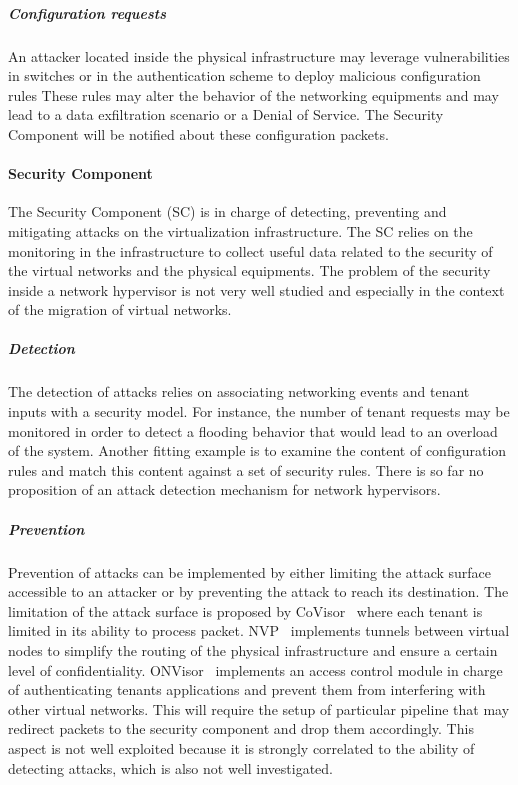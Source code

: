 \subparagraph{Configuration requests} An attacker located inside the physical infrastructure may leverage vulnerabilities in switches or in the authentication scheme to deploy malicious configuration rules These rules may alter the behavior of the networking equipments and may lead to a data exfiltration scenario or a Denial of Service.
The Security Component will be notified about these configuration packets.

\paragraph{Security Component}
The Security Component (SC) is in charge of detecting, preventing and mitigating attacks on the virtualization infrastructure. The SC relies on the monitoring in the infrastructure to collect useful data related to the security of the virtual networks and the physical equipments.
The problem of the security inside a network hypervisor is not very well studied and especially in the context of the migration of virtual networks.

\subparagraph{Detection}
The detection of attacks relies on associating networking events and tenant inputs with a security model.
For instance, the number of tenant requests may be monitored in order to detect a flooding behavior that would lead to an overload of the system. Another fitting example is to examine the content of configuration rules and match this content against a set of security rules.
There is so far no proposition of an attack detection mechanism for network hypervisors.

\subparagraph{Prevention}
Prevention of attacks can be implemented by either limiting the attack surface accessible to an attacker or by preventing the attack to reach its destination. The limitation of the attack surface is proposed by CoVisor~\cite{CoVisor-Jin2015} where each tenant is limited in its ability to process packet.
NVP~\cite{NVP-Koponen2014} implements tunnels between virtual nodes to simplify the routing of the physical infrastructure and ensure a certain level of confidentiality.
ONVisor~\cite{ONVisor-Han2018} implements an access control module in charge of authenticating tenants applications and prevent them from interfering with other virtual networks.
This will require the setup of particular pipeline that may redirect packets to the security component and drop them accordingly. This aspect is not well exploited because it is strongly correlated to the ability of detecting attacks, which is also not well investigated. 

